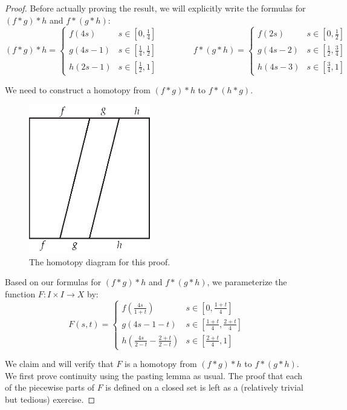 \begin{proof}
	Before actually proving the result, we will explicitly write the formulas for $(f*g)*h$ and $f*(g*h)$:
	\[(f*g)*h = 
	\begin{cases}
		f(4s) & s\in [0,\frac14] \\
		g(4s-1) & s\in[\frac14,\frac12] \\
		h(2s-1) & s\in [\frac12,1] 
	\end{cases}
	\qquad\qquad f*(g*h) = 
	\begin{cases}
		f(2s) & s\in [0,\frac12] \\
		g(4s-2) & s\in[\frac12,\frac34] \\
		h(4s-3) & s\in [\frac34,1] 
	\end{cases}
	\]
	
	We need to construct a homotopy from $(f*g)*h$ to $f*(h*g)$. 
	\begin{figure}[ht!]
	    \centering
	    \includegraphics[width=150pt]{images/fundamental_group/fgh_diagram}
	    \caption{The homotopy diagram for this proof.}
    \end{figure}
	
	Based on our formulas for $(f*g)*h$ and $f*(g*h)$, we parameterize the function $F:I\times I \to X$ by:
	\[F(s,t) = 
	\begin{cases}
		f\left(\frac{4s}{1+t} \right)& s \in \left[ 0,\frac{1+t}4 \right] \\
		g(4s-1-t) & s\in \left[\frac{1+t}4, \frac{2+t}4\right] \\
		h\left(\frac{4s}{2-t} - \frac{2+t}{2-t} \right) & s\in \left[\frac{2+t}4,1\right] 
	\end{cases}
	\]
	
	We claim and will verify that $F$ is a homotopy from $(f*g)*h$ to $f*(g*h)$. We first prove continuity using the pasting lemma as usual. The proof that each of the piecewise parts of $F$ is defined on a closed set is left as a (relatively trivial but tedious) exercise.
	

\end{proof}
